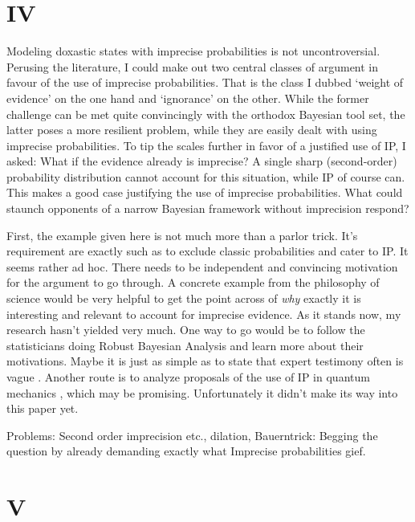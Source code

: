 \documentclass[11pt, a4paper]{scrartcl}
\begin{document}
\section{IV}

Modeling doxastic states with imprecise probabilities is not uncontroversial. Perusing the literature, I could make out two central classes of argument in favour of the use of imprecise probabilities. That is the class I dubbed `weight of evidence' on the one hand and `ignorance' on the other. While the former challenge can be met quite convincingly with the orthodox Bayesian tool set, the latter poses a more resilient problem, while they are easily dealt with using imprecise probabilities. To tip the scales further in favor of a justified use of IP, I asked: What if the evidence already is imprecise? A single sharp (second-order) probability distribution cannot account for this situation, while IP of course can. This makes a good case justifying the use of imprecise probabilities. What could staunch opponents of a narrow Bayesian framework without imprecision respond? 

First, the example given here is not much more than a parlor trick. It's requirement are exactly such as to exclude classic probabilities and cater to IP. It seems rather ad hoc. There needs to be independent and convincing motivation for the argument to go through. A concrete example from the philosophy of science would be very helpful to get the point across of \emph{why} exactly it is interesting and relevant to account for imprecise evidence. As it stands now, my research hasn't yielded very much. One way to go would be to follow the statisticians doing Robust Bayesian Analysis \citep{Berger1994} and learn more about their motivations. Maybe it is just as simple as to state that expert testimony often is vague \citep{Destercke2014}. Another route is to analyze proposals of the use of IP in quantum mechanics \citep{pittphilsci4734}, which may be promising. Unfortunately it didn't make its way into this paper yet.

Problems: Second order imprecision etc., dilation, Bauerntrick: Begging the question by already demanding exactly what Imprecise probabilities gief.

\section{V}


\begin{singlespacing}
\printbibliography{}
\end{singlespacing}
\end{document}
